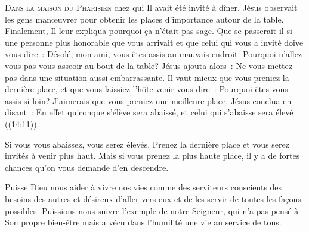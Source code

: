 
\lettrine{D}{ans la maison du Pharisien} chez qui Il avait été invité à dîner,
 Jésus observait les gens manœuvrer pour obtenir les places
 d'importance autour de la table. Finalement, Il leur expliqua pourquoi
 ça n'était pas sage.
 \og Que se passerait-il si une personne plus honorable que vous arrivait
 et que celui qui vous a invité doive vous dire~: 
 \og Désolé, mon ami, vous êtes assis au mauvais endroit.
 Pourquoi n'allez-vous pas vous asseoir au bout de la table? \fg{}
 Jésus ajouta alors~: 
 \og Ne vous mettez pas dans une situation aussi embarrassante.
 Il vaut mieux que vous preniez la dernière place, et que vous laissiez
 l'hôte venir vous dire~: 
 \og Pourquoi êtes-vous assis si loin?
 J'aimerais que vous preniez une meilleure place. \fg{}
 Jésus conclua en disant~:
 \og En effet quiconque s'élève sera abaissé,
 et celui qui s'abaisse sera élevé \fg{} ((14:11)).


Si vous vous abaissez, vous serez élevés.
 Prenez la dernière place et vous serez invités à venir plus haut.
 Mais si vous prenez la plus haute place,
 il y a de fortes chances qu'on vous demande d'en descendre.

Puisse Dieu nous aider à vivre nos vies comme des serviteurs
 \ocadr conscients des besoins des autres et désireux d'aller vers eux
 et de les servir de toutes les façons possibles.
 Puissions-nous suivre l'exemple de notre Seigneur,
 qui n'a pas pensé à Son propre bien-être mais a vécu
 dans l'humilité une vie au service de tous.

\dvrule






